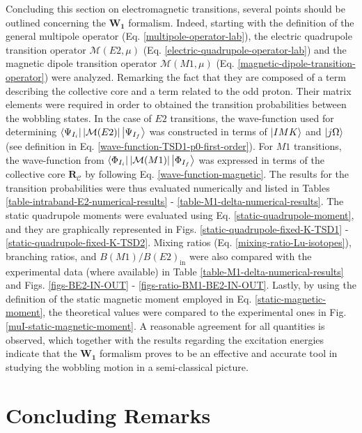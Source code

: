 Concluding this section on electromagnetic transitions, several points should be outlined concerning the $\mathbf{W_1}$ formalism. Indeed, starting with the definition of the general multipole operator (Eq. \ref{multipole-operator-lab}), the electric quadrupole transition operator $\mathcal{M}(E2,\mu)$ (Eq. \ref{electric-quadrupole-operator-lab}) and the magnetic dipole transition operator $\mathcal{M}(M1,\mu)$ (Eq. \ref{magnetic-dipole-transition-operator}) were analyzed. Remarking the fact that they are composed of a term describing the collective core and a term related to the odd proton. Their matrix elements were required in order to obtained the transition probabilities between the wobbling states. In the case of $E2$ transitions, the wave-function used for determining $\bra{\Psi_{I_i}}|\mathcal{M}(E2)|\ket{\Psi_{I_f}}$ was constructed in terms of $\ket{IMK}$ and $\ket{j\Omega}$ (see definition in Eq. \ref{wave-function-TSD1-p0-first-order}). For $M1$ transitions, the wave-function from $\bra{\Phi_{I_i}}|\mathcal{M}(M1)|\ket{\Phi_{I_f}}$ was expressed in terms of the collective core $\mathbf{R}_\mathscr{C}$ by following Eq. \ref{wave-function-magnetic}. The results for the transition probabilities were thus evaluated numerically and listed in Tables \ref{table-intraband-E2-numerical-results} - \ref{table-M1-delta-numerical-results}. The static quadrupole moments were evaluated using Eq. \ref{static-quadrupole-moment}, and they are graphically represented in Figs. \ref{static-quadrupole-fixed-K-TSD1} - \ref{static-quadrupole-fixed-K-TSD2}. Mixing ratios (Eq. \ref{mixing-ratio-Lu-isotopes}), branching ratios, and $B(M1)/B(E2)_\text{in}$ were also compared with the experimental data (where available) in Table \ref{table-M1-delta-numerical-results} and Figs. \ref{figs-BE2-IN-OUT} - \ref{figs-ratio-BM1-BE2-IN-OUT}. Lastly, by using the definition of the static magnetic moment employed in Eq. \ref{static-magnetic-moment}, the theoretical values were compared to the experimental ones in Fig. \ref{muI-static-magnetic-moment}. A reasonable agreement for all quantities is observed, which together with the results regarding the excitation energies indicate that the $\mathbf{W_1}$ formalism proves to be an effective and accurate tool in studying the wobbling motion in a semi-classical picture.

\section{Concluding Remarks}
\label{c6-concluding-remarks}

